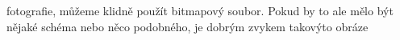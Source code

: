 \documentclass[11pt,a4paper]{article}
\begin{document}
 fotografie, můžeme klidně použít
bitmapový soubor. Pokud by to ale mělo být nějaké schéma nebo něco podobného, je dobrým zvykem takovýto
obráze
\end{document}
